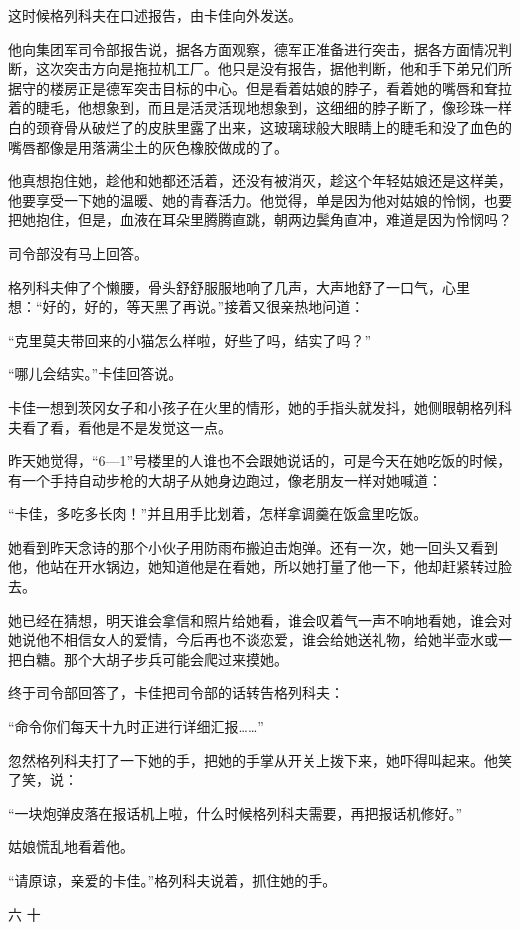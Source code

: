 这时候格列科夫在口述报告，由卡佳向外发送。

他向集团军司令部报吿说，据各方面观察，德军正准备进行突击，据各方面情况判断，这次突击方向是拖拉机工厂。他只是没有报告，据他判断，他和手下弟兄们所据守的楼房正是德军突击目标的中心。但是看着姑娘的脖子，看着她的嘴唇和耷拉着的睫毛，他想象到，而且是活灵活现地想象到，这细细的脖子断了，像珍珠一样白的颈脊骨从破烂了的皮肤里露了出来，这玻璃球般大眼睛上的睫毛和没了血色的嘴唇都像是用落满尘土的灰色橡胶做成的了。

他真想抱住她，趁他和她都还活着，还没有被消灭，趁这个年轻姑娘还是这样美，他要享受一下她的温暖、她的青春活力。他觉得，单是因为他对姑娘的怜悯，也要把她抱住，但是，血液在耳朵里腾腾直跳，朝两边鬓角直冲，难道是因为怜悯吗？

司令部没有马上回答。

格列科夫伸了个懒腰，骨头舒舒服服地响了几声，大声地舒了一口气，心里想：“好的，好的，等天黑了再说。”接着又很亲热地问道：

“克里莫夫带回来的小猫怎么样啦，好些了吗，结实了吗？”

“哪儿会结实。”卡佳回答说。

卡佳一想到茨冈女子和小孩子在火里的情形，她的手指头就发抖，她侧眼朝格列科夫看了看，看他是不是发觉这一点。

昨天她觉得，“6—1”号楼里的人谁也不会跟她说话的，可是今天在她吃饭的时候，有一个手持自动步枪的大胡子从她身边跑过，像老朋友一样对她喊道：

“卡佳，多吃多长肉！”并且用手比划着，怎样拿调羹在饭盒里吃饭。

她看到昨天念诗的那个小伙子用防雨布搬迫击炮弹。还有一次，她一回头又看到他，他站在开水锅边，她知道他是在看她，所以她打量了他一下，他却赶紧转过脸去。

她已经在猜想，明天谁会拿信和照片给她看，谁会叹着气一声不响地看她，谁会对她说他不相信女人的爱情，今后再也不谈恋爱，谁会给她送礼物，给她半壶水或一把白糖。那个大胡子步兵可能会爬过来摸她。

终于司令部回答了，卡佳把司令部的话转告格列科夫：

“命令你们每天十九时正进行详细汇报……”

忽然格列科夫打了一下她的手，把她的手掌从开关上拨下来，她吓得叫起来。他笑了笑，说：

“一块炮弹皮落在报话机上啦，什么时候格列科夫需要，再把报话机修好。”

姑娘慌乱地看着他。

“请原谅，亲爱的卡佳。”格列科夫说着，抓住她的手。

六 十

